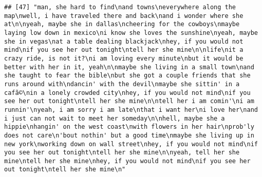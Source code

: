\documentclass[]{article}
\begin{document}
\begin{verbatim}
## [47] "man, she hard to find\nand towns\neverywhere along the map\nwell, i have traveled there and back\nand i wonder where she at\n\nyeah, maybe she in dallas\ncheering for the cowboys\nmaybe laying low down in mexico\ni know she loves the sunshine\nyeah, maybe she in vegas\nat a table dealing blackjack\nhey, if you would not mind\nif you see her out tonight\ntell her she mine\n\nlife\nit a crazy ride, is not it?\ni am loving every minute\nbut it would be better with her in it, yeah\n\nmaybe she living in a small town\nand she taught to fear the bible\nbut she got a couple friends that she runs around with\ndancin' with the devil\nmaybe she sittin' in a cafã©\nin a lonely crowded city\nhey, if you would not mind\nif you see her out tonight\ntell her she mine\n\ntell her i am comin'\ni am runnin'\nyeah, i am sorry i am late\nthat i want her\ni love her\nand i just can not wait to meet her someday\n\nhell, maybe she a hippie\nhangin' on the west coast\nwith flowers in her hair\nprob'ly does not care\n'bout nothin' but a good time\nmaybe she living up in new york\nworking down on wall street\nhey, if you would not mind\nif you see her out tonight\ntell her she mine\n\nyeah, tell her she mine\ntell her she mine\nhey, if you would not mind\nif you see her out tonight\ntell her she mine\n"                                                                                                                                                                                                                                                                                                                                                                                                                                                                                                                                                                                                                                                                                                                                                                                                                                                                                                                                                                                                                                                                                                                                                                                                                                                                                                                                                                                                                                                                                                                                                                                                                                

\end{verbatim}
\end{document}
